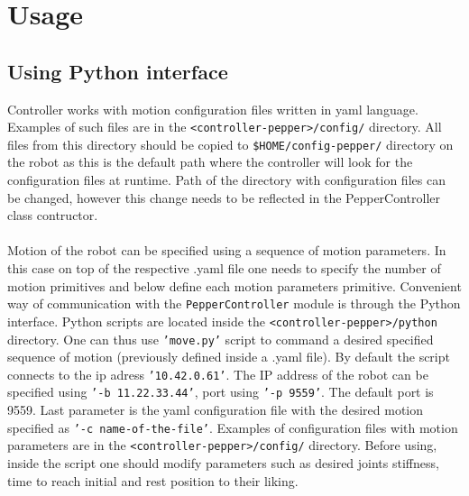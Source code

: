 \section{Usage}

\subsection{Using Python interface}
\noindent Controller works with motion configuration files written in yaml language. Examples of such files are in the
\texttt{<controller-pepper>/config/} directory. All files from this directory should be copied to
\texttt{\$HOME/config-pepper/} directory on the robot as this is the default path where the controller will look for the configuration files 
at runtime. Path of the directory with configuration files can be changed, however this change needs to be reflected in
the PepperController class contructor.\\ \\
\noindent Motion of the robot can be specified using a sequence of motion parameters. In this case on top of the
respective .yaml file one needs to specify the number of motion primitives and below define each motion parameters
primitive.
\noindent Convenient way of communication with the \texttt{PepperController} module is through the Python interface. Python scripts are located
inside the \texttt{<controller-pepper>/python} directory. One can thus use \texttt{'move.py'} script to command a desired specified
sequence of motion (previously defined inside a .yaml file). By default the script connects to the ip adress
\texttt{'10.42.0.61'}. The IP address of the robot can be specified using \texttt{'-b 11.22.33.44'}, port using
\texttt{'-p 9559'}. The default port is 9559. Last parameter is the yaml configuration file with the desired motion specified as 
\texttt{'-c name-of-the-file'}. Examples of configuration files with motion parameters are in the
\texttt{<controller-pepper>/config/} directory. Before using, inside the script one should modify parameters such as desired joints stiffness,
time to reach initial and rest position to their liking.\\ \\

